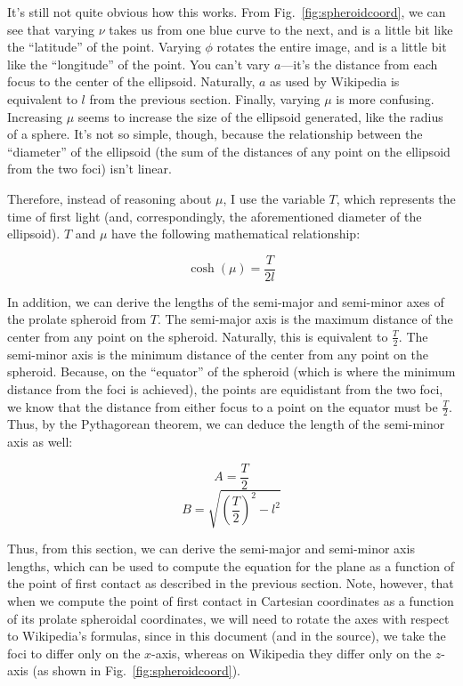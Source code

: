 \documentclass[11pt]{article}
\begin{document}
It's still not quite obvious how this works. From Fig.~\ref{fig:spheroidcoord}, we can see that varying $\nu$ takes us from one blue curve to the next, and is a little bit like the ``latitude'' of the point. Varying $\phi$ rotates the entire image, and is a little bit like the ``longitude'' of the point. You can't vary $a$---it's the distance from each focus to the center of the ellipsoid. Naturally, $a$ as used by Wikipedia is equivalent to $l$ from the previous section. Finally, varying $\mu$ is more confusing. Increasing $\mu$ seems to increase the size of the ellipsoid generated, like the radius of a sphere. It's not so simple, though, because the relationship between the ``diameter'' of the ellipsoid (the sum of the distances of any point on the ellipsoid from the two foci) isn't linear. 

Therefore, instead of reasoning about $\mu$, I use the variable $T$, which represents the time of first light (and, correspondingly, the aforementioned diameter of the ellipsoid). $T$ and $\mu$ have the following mathematical relationship:

\begin{equation}
\cosh(\mu) = \frac{T}{2l}
\end{equation}

In addition, we can derive the lengths of the semi-major and semi-minor axes of the prolate spheroid from $T$. The semi-major axis is the maximum distance of the center from any point on the spheroid. Naturally, this is equivalent to $\frac{T}{2}$. The semi-minor axis is the minimum distance of the center from any point on the spheroid. Because, on the ``equator'' of the spheroid (which is where the minimum distance from the foci is achieved), the points are equidistant from the two foci, we know that the distance from either focus to a point on the equator must be $\frac{T}{2}$. Thus, by the Pythagorean theorem, we can deduce the length of the semi-minor axis as well:

\begin{equation}
A = \frac{T}{2}
\end{equation}
\begin{equation}
B = \sqrt{\left(\frac{T}{2}\right)^2 - l^2}
\end{equation}

Thus, from this section, we can derive the semi-major and semi-minor axis lengths, which can be used to compute the equation for the plane as a function of the point of first contact as described in the previous section. Note, however, that when we compute the point of first contact in Cartesian coordinates as a function of its prolate spheroidal coordinates, we will need to rotate the axes with respect to Wikipedia's formulas, since in this document (and in the source), we take the foci to differ only on the $x$-axis, whereas on Wikipedia they differ only on the $z$-axis (as shown in Fig.~\ref{fig:spheroidcoord}).
\end{document}
